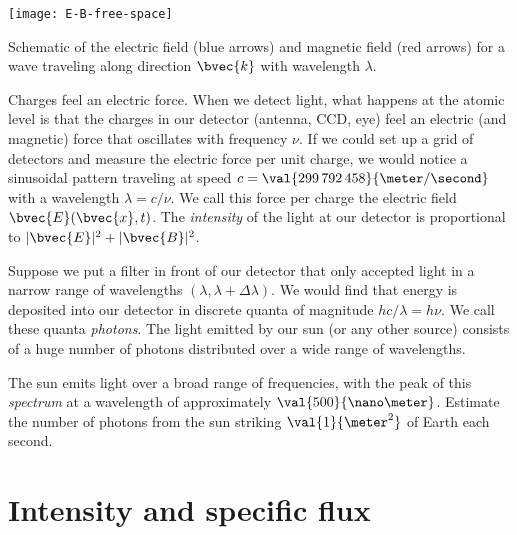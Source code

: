 \begin{marginfigure}
\texttt{[image: E-B-free-space]}
\caption[The electric force in a light wave]{Schematic of the electric field (blue arrows) and magnetic field (red arrows) for a wave traveling along direction $\bvec{k}$ with wavelength $\lambda$.}
\label{f.light-wave}
\end{marginfigure}
Charges feel an electric force.
When we detect light, what happens at the atomic level is that the charges in our detector (antenna, CCD, eye) feel an electric (and magnetic) force that oscillates with frequency $\nu$. If we could set up a grid of detectors and measure the electric force per unit charge, we would notice a sinusoidal pattern traveling at speed $c = \val{299\,792\,458}{\meter/\second}$ with a wavelength $\lambda = c/\nu$.  We call this force per charge the electric field $\bvec{E}(\bvec{x},t)$. The \emph{intensity} of the light at our detector is proportional to $|\bvec{E}|^{2} + |\bvec{B}|^{2}$.

Suppose we put a filter in front of our detector that only accepted light in a narrow range of wavelengths $(\lambda,\lambda+\Delta\lambda)$. We would find that energy is deposited into our detector in discrete quanta of magnitude $hc/\lambda = h\nu$. We call these quanta \emph{photons}. The light emitted by our sun (or any other source) consists of a huge number of photons distributed over a wide range of wavelengths.

\begin{exercisebox}
The sun emits light over a broad range of frequencies, with the peak of this \emph{spectrum} at a wavelength of approximately $\val{500}{\nano\meter}$. Estimate the number of photons from the sun striking $\val{1}{\meter^{2}}$ of Earth each second.
\end{exercisebox}

\section{Intensity and specific flux}
\label{s.intensity-specific-flux}

